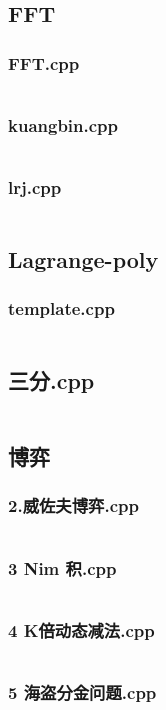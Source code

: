 \documentclass[a4paper,11pt]{article}
\begin{document}
\subsection{FFT}
\subsubsection{FFT.cpp}
\inputminted{c++}{"D:/tmplz/templates/数学/FFT/FFT.cpp"}
\subsubsection{kuangbin.cpp}
\inputminted{c++}{"D:/tmplz/templates/数学/FFT/kuangbin.cpp"}
\subsubsection{lrj.cpp}
\inputminted{c++}{"D:/tmplz/templates/数学/FFT/lrj.cpp"}
\subsection{Lagrange-poly}
\subsubsection{template.cpp}
\inputminted{c++}{"D:/tmplz/templates/数学/Lagrange-poly/template.cpp"}
\subsection{三分.cpp}
\inputminted{c++}{"D:/tmplz/templates/数学/三分.cpp"}
\subsection{博弈}
\subsubsection{2.威佐夫博弈.cpp}
\inputminted{c++}{"D:/tmplz/templates/数学/博弈/2.威佐夫博弈.cpp"}
\subsubsection{3 Nim 积.cpp}
\inputminted{c++}{"D:/tmplz/templates/数学/博弈/3 Nim 积.cpp"}
\subsubsection{4 K倍动态减法.cpp}
\inputminted{c++}{"D:/tmplz/templates/数学/博弈/4 K倍动态减法.cpp"}
\subsubsection{5 海盗分金问题.cpp}
\inputminted{c++}{"D:/tmplz/templates/数学/博弈/5 海盗分金问题.cpp"}
\end{document}
